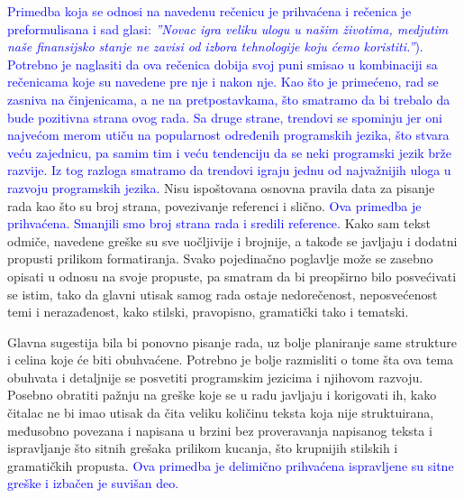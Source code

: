 \documentclass[a4paper]{report}
\newcommand{\odgovor}[1]{\textcolor{blue}{#1}}
\begin{document}
\odgovor{Primedba koja se odnosi na navedenu rečenicu je prihvaćena i rečenica je preformulisana i sad glasi: \textit{''Novac igra veliku ulogu u našim životima, medjutim naše finansijsko stanje ne zavisi od izbora tehnologije koju ćemo koristiti.''}). Potrebno je naglasiti da ova rečenica dobija svoj puni smisao u kombinaciji sa rečenicama koje su navedene pre nje i nakon nje. Kao što je primećeno, rad se zasniva na činjenicama, a ne na pretpostavkama, što smatramo da bi trebalo da bude pozitivna strana ovog rada. Sa druge strane, trendovi se spominju jer oni najvećom merom utiču na popularnost određenih programskih jezika, što stvara veću zajednicu, pa samim tim i veću tendenciju da se neki programski jezik brže razvije. Iz tog razloga smatramo da trendovi igraju jednu od najvažnijih uloga u razvoju programskih jezika.}
Nisu ispoštovana osnovna pravila data za pisanje rada kao što su broj strana, povezivanje referenci i slično. 
\odgovor{Ova primedba je prihvaćena. Smanjili smo broj strana rada i sredili reference.}
Kako sam tekst odmiče, navedene greške su sve uočljivije i brojnije, a takođe se javljaju i dodatni propusti prilikom formatiranja. Svako pojedinačno poglavlje može se zasebno opisati u odnosu na svoje propuste, pa smatram da bi preopširno bilo posvećivati se istim, tako da glavni utisak samog rada ostaje nedorečenost, neposvećenost temi i nerazađenost, kako stilski, pravopisno, gramatički tako i tematski. \par Glavna sugestija bila bi ponovno pisanje rada, uz bolje planiranje same strukture i celina koje će biti obuhvaćene. Potrebno je bolje razmisliti o tome šta ova tema obuhvata i detaljnije se posvetiti programskim jezicima i njihovom razvoju. Posebno obratiti pažnju na greške koje se u radu javljaju i korigovati ih, kako čitalac ne bi imao utisak da čita veliku količinu teksta koja nije struktuirana, međusobno povezana i napisana u brzini bez proveravanja napisanog teksta i ispravljanje što sitnih grešaka prilikom kucanja, što krupnijih stilskih i gramatičkih propusta.
\odgovor{Ova primedba je delimično prihvaćena ispravljene su sitne greške i izbačen je suvišan deo.}
\end{document}
